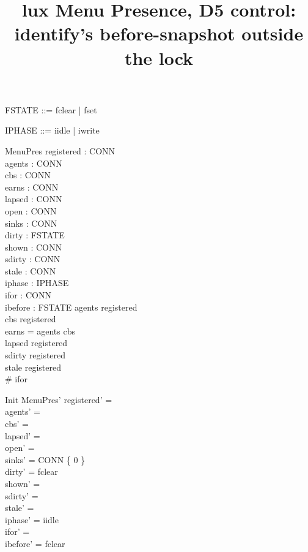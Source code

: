 \documentclass[a4paper,10pt,fleqn]{article}
\begin{document}
\title{lux Menu Presence, D5 control: identify's before-snapshot outside the lock}
\maketitle

\begin{zed}
  [CONN]
\end{zed}

\begin{zed}
  FSTATE ::= fclear | fset
\end{zed}

\begin{zed}
  IPHASE ::= iidle | iwrite
\end{zed}

\begin{schema}{MenuPres}
  registered : \power CONN \\
  agents : \power CONN \\
  cbs : \power CONN \\
  earns : \power CONN \\
  lapsed : \power CONN \\
  open : \power CONN \\
  sinks : CONN   \\
  dirty : FSTATE \\
  shown : \power CONN \\
  sdirty : \power CONN \\
  stale : \power CONN
 \\
  iphase : IPHASE \\
  ifor : \power CONN \\
  ibefore : FSTATE
\where
  agents \subseteq registered \\
  cbs \subseteq registered \\
  earns = agents \cup cbs \\
  lapsed \subseteq registered \\
  sdirty \subseteq registered \\
  stale \subseteq registered \\
  \# ifor 
\end{schema}

\begin{schema}{Init}
  MenuPres'
\where
  registered' = \emptyset \\
  agents' = \emptyset \\
  cbs' = \emptyset \\
  lapsed' = \emptyset \\
  open' = \emptyset \\
  sinks' = CONN \cross \{ 0 \} \\
  dirty' = fclear \\
  shown' = \emptyset \\
  sdirty' = \emptyset \\
  stale' = \emptyset \\
  iphase' = iidle \\
  ifor' = \emptyset \\
  ibefore' = fclear
\end{schema}
\end{document}
